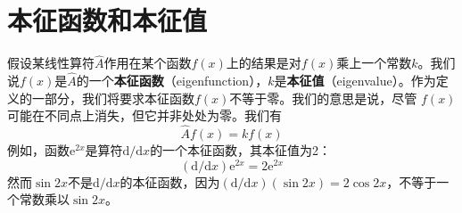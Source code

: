 \section{本征函数和本征值}
	假设某线性算符$\hat{A}$作用在某个函数$f\left(x\right)$上的结果是对$f\left(x\right)$乘上一个常数$k$。我们说$f\left(x\right)$是$\hat{A}$的一个\textbf{本征函数}（eigenfunction），$k$是\textbf{本征值}（eigenvalue）。作为定义的一部分，我们将要求本征函数$f\left(x\right)$不等于零。我们的意思是说，尽管 $f\left(x\right)$ 可能在不同点上消失，但它并非处处为零。我们有
	\begin{equation}
		\boxed{
			\hat{A}f\left(x\right) = kf\left(x\right)
		}
		\label{eq:3.14 definition of eigenfunctions and eigenvalues}
	\end{equation}
	例如，函数$\mathrm{e}^{2x}$是算符$\mathrm{d}/\mathrm{d}x$的一个本征函数，其本征值为2：
	\begin{equation*}
		\left(\mathrm{d}/\mathrm{d}x\right)\mathrm{e}^{2x} = 2 \mathrm{e}^{2x}
	\end{equation*}
	然而$\sin 2x$不是$\mathrm{d}/\mathrm{d}x$的本征函数，因为$\left(\mathrm{d}/\mathrm{d}x\right)\left(\sin 2x\right) = 2 \cos 2x$，不等于一个常数乘以$\sin 2x$。

